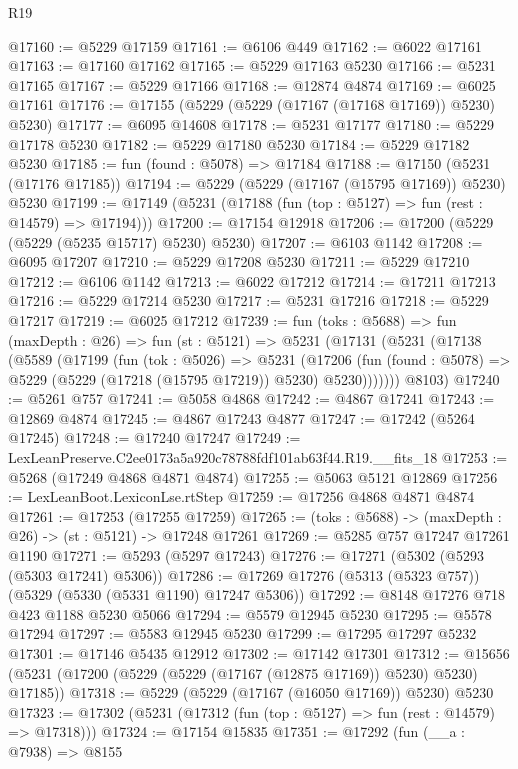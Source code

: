 \begin{lexlean}{R19}
\begin{coremodule}
@17160 := @5229 @17159
@17161 := @6106 @449
@17162 := @6022 @17161
@17163 := @17160 @17162
@17165 := @5229 @17163 @5230
@17166 := @5231 @17165
@17167 := @5229 @17166
@17168 := @12874 @4874
@17169 := @6025 @17161
@17176 := @17155 (@5229 (@5229 (@17167 (@17168 @17169)) @5230) @5230)
@17177 := @6095 @14608
@17178 := @5231 @17177
@17180 := @5229 @17178 @5230
@17182 := @5229 @17180 @5230
@17184 := @5229 @17182 @5230
@17185 := fun (found : @5078) => @17184
@17188 := @17150 (@5231 (@17176 @17185))
@17194 := @5229 (@5229 (@17167 (@15795 @17169)) @5230) @5230
@17199 := @17149 (@5231 (@17188 (fun (top : @5127) => fun (rest : @14579) => @17194)))
@17200 := @17154 @12918
@17206 := @17200 (@5229 (@5229 (@5235 @15717) @5230) @5230)
@17207 := @6103 @1142
@17208 := @6095 @17207
@17210 := @5229 @17208 @5230
@17211 := @5229 @17210
@17212 := @6106 @1142
@17213 := @6022 @17212
@17214 := @17211 @17213
@17216 := @5229 @17214 @5230
@17217 := @5231 @17216
@17218 := @5229 @17217
@17219 := @6025 @17212
@17239 := fun (toks : @5688) =>
  fun (maxDepth : @26) =>
  fun (st : @5121) =>
  @5231
    (@17131
      (@5231
        (@17138
          (@5589
            (@17199
              (fun (tok : @5026) =>
              @5231
                (@17206
                  (fun (found : @5078) => @5229 (@5229 (@17218 (@15795 @17219)) @5230) @5230)))))))
      @8103)
@17240 := @5261 @757
@17241 := @5058 @4868
@17242 := @4867 @17241
@17243 := @12869 @4874
@17245 := @4867 @17243 @4877
@17247 := @17242 (@5264 @17245)
@17248 := @17240 @17247
@17249 := LexLeanPreserve.C2ee0173a5a920c78788fdf101ab63f44.R19.__fits_18
@17253 := @5268 (@17249 @4868 @4871 @4874)
@17255 := @5063 @5121 @12869
@17256 := LexLeanBoot.LexiconLse.rtStep
@17259 := @17256 @4868 @4871 @4874
@17261 := @17253 (@17255 @17259)
@17265 := (toks : @5688) -> (maxDepth : @26) -> (st : @5121) -> @17248 @17261
@17269 := @5285 @757 @17247 @17261 @1190
@17271 := @5293 (@5297 @17243)
@17276 := @17271 (@5302 (@5293 (@5303 @17241) @5306))
@17286 := @17269 @17276 (@5313 (@5323 @757)) (@5329 (@5330 (@5331 @1190) @17247 @5306))
@17292 := @8148 @17276 @718 @423 @1188 @5230 @5066
@17294 := @5579 @12945 @5230
@17295 := @5578 @17294
@17297 := @5583 @12945 @5230
@17299 := @17295 @17297 @5232
@17301 := @17146 @5435 @12912
@17302 := @17142 @17301
@17312 := @15656 (@5231 (@17200 (@5229 (@5229 (@17167 (@12875 @17169)) @5230) @5230) @17185))
@17318 := @5229 (@5229 (@17167 (@16050 @17169)) @5230) @5230
@17323 := @17302 (@5231 (@17312 (fun (top : @5127) => fun (rest : @14579) => @17318)))
@17324 := @17154 @15835
@17351 := @17292
    (fun (__a : @7938) =>
    @8155

\end{coremodule}
\end{lexlean}
